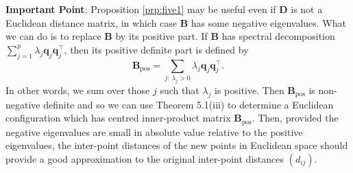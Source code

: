 \documentclass[]{book}
\theoremstyle{definition}
\theoremstyle{definition}
\theoremstyle{definition}
\theoremstyle{remark}
\begin{document}
\textbf{Important Point}: Proposition \ref{prp:five1} may be useful even if \({\mathbf D}\) is not a Euclidean distance matrix, in which case \(\boldsymbol B\) has some negative eigenvalues. What we can do is to replace \(\boldsymbol B\) by its positive part. If \(\boldsymbol B\) has spectral decomposition \(\sum_{j=1}^p \lambda_j \boldsymbol q_j \boldsymbol q_j^\top\), then its positive definite part is defined by
\[
\boldsymbol B_{\text{pos}}=\sum_{j: \, \lambda_j>0} \lambda_j \boldsymbol q_j \boldsymbol q_j^\top.
\]
In other words, we sum over those \(j\) such that \(\lambda_j\) is positive.
Then \(\boldsymbol B_{\text{pos}}\) is non-negative definite and so we can use Theorem 5.1(iii) to determine a Euclidean configuration which has centred inner-product matrix \(\boldsymbol B_{\text{pos}}\). Then, provided the negative eigenvalues are small in absolute value relative to the positive eigenvalues, the inter-point distances of the new points in Euclidean space should provide a good approximation to the original inter-point distances \((d_{ij})\).
\end{document}
